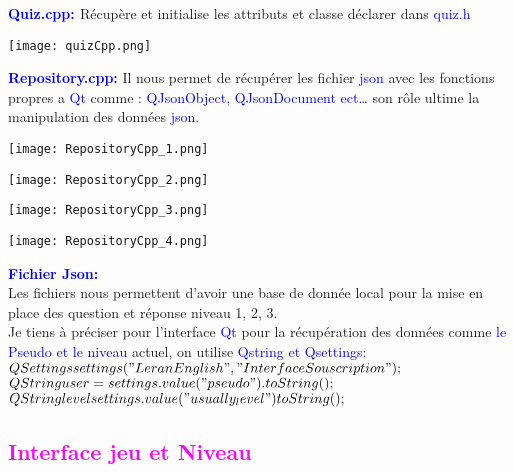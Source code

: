 \documentclass[12pt, a4paper]{report}
\begin{document}
\textbf{\textcolor{blue}{Quiz.cpp: }} Récupère et initialise les attributs et classe déclarer dans \textcolor{blue}{quiz.h}
\bigskip
\begin{center}
\texttt{[image: quizCpp.png]}
\end{center}

\textbf{\textcolor{blue}{Repository.cpp:}} Il nous permet de récupérer les fichier \textcolor{blue}{json} avec les fonctions propres a \textcolor{blue}{Qt} comme : \textcolor{blue}{QJsonObject, QJsonDocument ect… } son rôle ultime la manipulation des données \textcolor{blue}{json}.
\bigskip
\begin{center}
\texttt{[image: RepositoryCpp\_1.png]}
\end{center}
\bigskip
\begin{center}
\texttt{[image: RepositoryCpp\_2.png]}
\end{center}
\bigskip
\begin{center}
\texttt{[image: RepositoryCpp\_3.png]}
\end{center}
\bigskip
\begin{center}
\texttt{[image: RepositoryCpp\_4.png]}
\end{center}
\textbf{\textcolor{blue}{Fichier Json: }}\\
Les fichiers nous permettent d’avoir une base de donnée local pour la mise en place des question et réponse niveau 1, 2, 3.\\
Je tiens à préciser pour l’interface \textcolor{blue}{Qt} pour la récupération des données comme \textcolor{blue}{le Pseudo et le niveau} actuel, on utilise \textcolor{blue}{Qstring et Qsettings:}\\

\textcolor{red}{$QSettings settings("LeranEnglish","InterfaceSouscription");$\\
$QString user = settings.value("pseudo").toString();$\\ 
$QString level settings.value("usually_level")toString();$}

\textcolor{magenta}{\section{Interface jeu et Niveau}}
\end{document}
